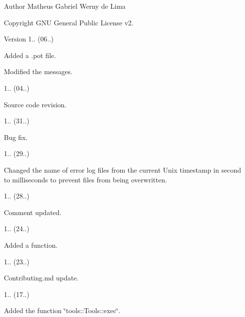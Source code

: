 \begin{DoxyAuthor}{Author}
Matheus Gabriel Werny de Lima 
\end{DoxyAuthor}
\begin{DoxyCopyright}{Copyright}
G\+NU General Public License v2. 
\end{DoxyCopyright}
\begin{DoxyVersion}{Version}
1.. (06..)
\begin{DoxyItemize}
\item Added a .pot file.
\item Modified the messages. 
\end{DoxyItemize}

1.. (04..)
\begin{DoxyItemize}
\item Source code revision. 
\end{DoxyItemize}

1.. (31..)
\begin{DoxyItemize}
\item Bug fix. 
\end{DoxyItemize}

1.. (29..)
\begin{DoxyItemize}
\item Changed the name of error log files from the current Unix timestamp in second to milliseconds to prevent files from being overwritten. 
\end{DoxyItemize}

1.. (28..)
\begin{DoxyItemize}
\item Comment updated. 
\end{DoxyItemize}

1.. (24..)
\begin{DoxyItemize}
\item Added a function. 
\end{DoxyItemize}

1.. (23..)
\begin{DoxyItemize}
\item Contributing.\+md update. 
\end{DoxyItemize}

1.. (17..)
\begin{DoxyItemize}
\item Added the function \char`\"{}tools\+::\+Tools\+::exec\char`\"{}. 
\end{DoxyItemize}


\end{DoxyVersion}
